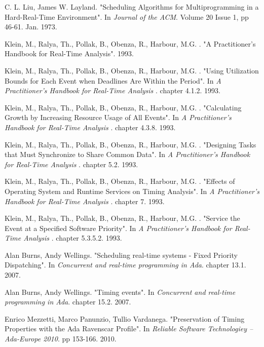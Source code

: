 \documentclass{article}
\begin{document}
\begin{thebibliography}{1}
C. L. Liu, James W. Layland.
\newblock "Scheduling Algorithms for Multiprogramming in a Hard-Real-Time Environment".
\newblock In {\em Journal of the ACM}. Volume 20 Issue 1, pp 46-61. Jan. 1973.

Klein, M., Ralya, Th., Pollak, B., Obenza, R., Harbour, M.G. .
\newblock "A Practitioner's Handbook for Real-Time Analysis". 1993.

Klein, M., Ralya, Th., Pollak, B., Obenza, R., Harbour, M.G. .
\newblock "Using Utilization Bounds for Each Event when Deadlines Are Within the Period".
\newblock In {\em A Practitioner's Handbook for Real-Time Analysis
}. chapter 4.1.2. 1993.

Klein, M., Ralya, Th., Pollak, B., Obenza, R., Harbour, M.G. .
\newblock "Calculating Growth by Increasing Resource Usage of All Events".
\newblock In {\em A Practitioner's Handbook for Real-Time Analysis
}. chapter 4.3.8. 1993.

Klein, M., Ralya, Th., Pollak, B., Obenza, R., Harbour, M.G. .
\newblock "Designing Tasks that Must Synchronize to Share Common Data".
\newblock In {\em A Practitioner's Handbook for Real-Time Analysis
}. chapter 5.2. 1993.

Klein, M., Ralya, Th., Pollak, B., Obenza, R., Harbour, M.G. .
\newblock "Effects of Operating System and Runtime Services on Timing Analysis".
\newblock In {\em A Practitioner's Handbook for Real-Time Analysis
}. chapter 7. 1993.

Klein, M., Ralya, Th., Pollak, B., Obenza, R., Harbour, M.G. .
\newblock "Service the Event at a Specified Software Priority".
\newblock In {\em A Practitioner's Handbook for Real-Time Analysis
}. chapter 5.3.5.2. 1993.

Alan Burns, Andy Wellings.
\newblock "Scheduling real-time systems - Fixed Priority Dispatching".
\newblock In {\em Concurrent and real-time programming in Ada}. chapter 13.1. 2007.

Alan Burns, Andy Wellings.
\newblock "Timing events".
\newblock In {\em Concurrent and real-time programming in Ada}. chapter 15.2. 2007.

Enrico Mezzetti, Marco Panunzio, Tullio Vardanega.
\newblock "Preservation of Timing Properties with the Ada Ravenscar Profile".
\newblock In {\em Reliable Software Technologiey – Ada-Europe 2010}. pp 153-166. 2010.


\end{thebibliography}
\end{document}
